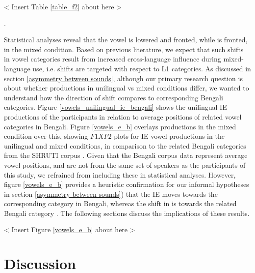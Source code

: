 \documentclass[12 pt]{article}
\newcommand{\nt}[1]{\textipa{[#1]}} %
\begin{document}
< Insert Table \ref{table_f2} about here >

.

Statistical analyses reveal that the vowel \nt{2} is lowered and fronted, while \nt{\ae} is fronted, in the mixed condition. Based on previous literature, we expect that such shifts in vowel categories result from increased cross-language influence during mixed-language use, i.e. shifts are targeted with respect to L1 categories. As discussed in section \ref{asymmetry between sounds}, although our primary research question is about whether productions in unilingual vs mixed conditions differ, we wanted to understand how the direction of shift compares to corresponding Bengali categories. Figure \ref{vowels_unilingual_ie_bengali} shows the unilingual IE productions of the participants in relation to average positions of related vowel categories in Bengali. Figure \ref{vowels_e_b} overlays productions in the mixed condition over this, showing $F1XF2$ plots for IE vowel productions in the unilingual and mixed conditions, in comparison to the related Bengali categories from the SHRUTI corpus \cite{shruticorpus}. Given that the Bengali corpus data represent average vowel positions, and are not from the same set of speakers as the participants of this study, we refrained from including these in statistical analyses. However, figure \ref{vowels_e_b} provides a heuristic confirmation for our informal hypotheses in section \ref{asymmetry between sounds}) that the IE \nt{\ae} moves towards the corresponding \nt{\ae} category in Bengali, whereas the shift in \nt{2} is towards the related Bengali category \nt{a:}. The following sections discuss the implications of these results.

< Insert Figure \ref{vowels_e_b} about here >

\section{Discussion}
\end{document}
